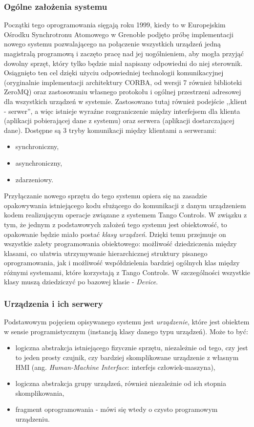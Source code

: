\subsubsection{Ogólne założenia systemu}
Początki tego oprogramowania sięgają roku 1999, kiedy to w Europejskim Ośrodku Synchrotronu Atomowego w Grenoble podjęto próbę implementacji nowego systemu pozwalającego na połączenie wszystkich urządzeń jedną magistralą programową i zaczęto pracę nad jej uogólnieniem, aby mogła przyjąć dowolny sprzęt, który tylko będzie miał napisany odpowiedni do niej sterownik. Osiągnięto ten cel dzięki użyciu odpowiedniej technologii komunikacyjnej (oryginalnie implementacji architektury CORBA, od wersji 7 również biblioteki ZeroMQ) oraz zastosowaniu własnego protokołu i ogólnej przestrzeni adresowej dla wszystkich urządzeń w systemie. Zastosowano tutaj również podejście ,,klient - serwer'', a więc istnieje wyraźne rozgraniczenie między interfejsem dla klienta (aplikacji pobierającej dane z systemu) oraz serwera (aplikacji dostarczającej dane). Dostępne są 3 tryby komunikacji między klientami a serwerami:
\begin{itemize}
    \item synchroniczny,
    \item asynchroniczny,
    \item zdarzeniowy.
\end{itemize}

Przyłączanie nowego sprzętu do tego systemu opiera się na zasadzie opakowywania istniejącego kodu służącego do komunikacji z danym urządzeniem kodem realizującym operacje związane z systemem Tango Controls. W związku z tym, że jednym z podstawowych założeń tego systemu jest obiektowość, to opakowanie będzie miało postać \emph{klasy urządzeń}.
Dzięki temu przejmuje on wszystkie zalety programowania obiektowego: możliwość dziedziczenia między klasami, co ułatwia utrzymywanie hierarchicznej struktury pisanego oprogramowania, jak i możliwość współdzielenia bardziej ogólnych klas między różnymi systemami, które korzystają z Tango Controls. W szczególności wszystkie klasy muszą dziedziczyć po bazowej klasie - \emph{Device}.

\subsubsection{Urządzenia i ich serwery}
Podstawowym pojęciem opisywanego systemu jest \emph{urządzenie}, które jest obiektem w sensie programistycznym (instancją klasy danego typu urządzeń). Może to być:
\begin{itemize}
    \item logiczna abstrakcja istniejącego fizycznie sprzętu, niezależnie od tego, czy jest to jeden prosty czujnik, czy bardziej skomplikowane urządzenie z własnym HMI (ang. \emph{Human-Machine Interface}: interfejs człowiek-maszyna),
    \item logiczna abstrakcja grupy urządzeń, również niezależnie od ich stopnia skomplikowania,
    \item fragment oprogramowania - mówi się wtedy o czysto programowym urządzeniu.
\end{itemize}

